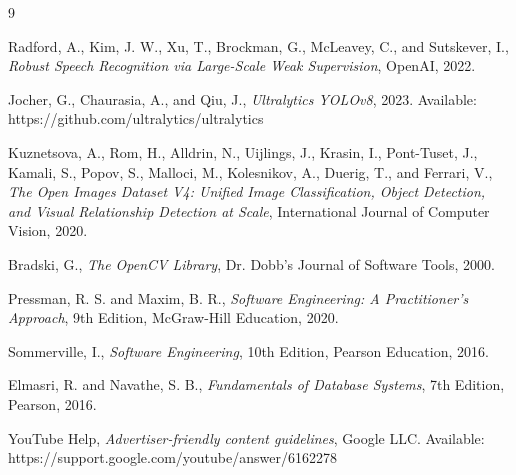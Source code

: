 \documentclass[12pt,a4paper,twoside]{report}
\begin{document}
\begin{thebibliography}{9}

Radford, A., Kim, J. W., Xu, T., Brockman, G., McLeavey, C., and Sutskever, I.,
\textit{Robust Speech Recognition via Large-Scale Weak Supervision}, OpenAI, 2022.

Jocher, G., Chaurasia, A., and Qiu, J.,
\textit{Ultralytics YOLOv8}, 2023. Available: https://github.com/ultralytics/ultralytics

Kuznetsova, A., Rom, H., Alldrin, N., Uijlings, J., Krasin, I., Pont-Tuset, J.,
Kamali, S., Popov, S., Malloci, M., Kolesnikov, A., Duerig, T., and Ferrari, V.,
\textit{The Open Images Dataset V4: Unified Image Classification, Object Detection,
and Visual Relationship Detection at Scale}, International Journal of Computer
Vision, 2020.

Bradski, G.,
\textit{The OpenCV Library}, Dr. Dobb's Journal of Software Tools, 2000.

Pressman, R. S. and Maxim, B. R.,
\textit{Software Engineering: A Practitioner's Approach}, 9th Edition,
McGraw-Hill Education, 2020.

Sommerville, I.,
\textit{Software Engineering}, 10th Edition, Pearson Education, 2016.

Elmasri, R. and Navathe, S. B.,
\textit{Fundamentals of Database Systems}, 7th Edition, Pearson, 2016.

YouTube Help,
\textit{Advertiser-friendly content guidelines}, Google LLC.
Available: https://support.google.com/youtube/answer/6162278

\end{thebibliography}
\end{document}
